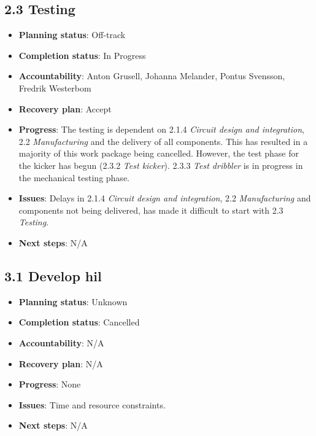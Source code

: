 \subsection*{2.3 Testing}
\begin{itemize}
    \item \textbf{Planning status}: Off-track
    \item \textbf{Completion status}: In Progress
    \item \textbf{Accountability}: Anton Grusell, Johanna Melander, Pontus Svensson, Fredrik Westerbom
    \item \textbf{Recovery plan}: Accept
    \item \textbf{Progress}: The testing is dependent on 2.1.4 \textit{Circuit design and integration}, 2.2 \textit{Manufacturing} and the delivery of all components. This has resulted in a majority of this work package being cancelled. However, the test phase for the kicker has begun (2.3.2 \textit{Test kicker}). 2.3.3 \textit{Test dribbler} is in progress in the mechanical testing phase.
    \item \textbf{Issues}: Delays in 2.1.4 \textit{Circuit design and integration}, 2.2 \textit{Manufacturing} and components not being delivered, has made it difficult to start with 2.3 \textit{Testing}.
    \item \textbf{Next steps}: N/A
\end{itemize}


\subsection*{3.1 Develop \acs{hil}}
\begin{itemize}
    \item \textbf{Planning status}: Unknown
    \item \textbf{Completion status}: Cancelled  
    \item \textbf{Accountability}: N/A
    \item \textbf{Recovery plan}: N/A
    \item \textbf{Progress}: None
    \item \textbf{Issues}: Time and resource constraints.
    \item \textbf{Next steps}: N/A
\end{itemize}


